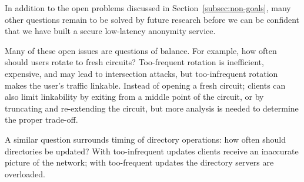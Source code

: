 \documentclass[times,10pt,twocolumn]{article}
\begin{document}
In addition to the open problems discussed in
Section~\ref{subsec:non-goals}, many other questions remain to be
solved by future research before we can be confident that we
have built a secure low-latency anonymity service.

Many of these open issues are questions of balance.  For example,
how often should users rotate to fresh circuits?  Too-frequent
rotation is inefficient, expensive, and may lead to intersection attacks,
but too-infrequent rotation
makes the user's traffic linkable.   Instead of opening a fresh
circuit; clients can also limit linkability by exiting from a middle point
of the circuit, or by truncating and re-extending the circuit, but
more analysis is needed to determine the proper trade-off.

A similar question surrounds timing of directory operations:
how often should directories be updated?  With too-infrequent
updates clients receive an inaccurate picture of the network; with
too-frequent updates the directory servers are overloaded.

%

\end{document}

